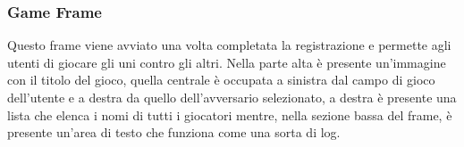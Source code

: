 \subsubsection{Game Frame}
\label{subsubsection:progettazione_game_frame}
Questo frame viene avviato una volta completata la registrazione e permette agli
utenti di giocare gli uni contro gli altri.\newline
Nella parte alta è presente un'immagine con il titolo del gioco, quella centrale
è occupata a sinistra dal campo di gioco dell'utente e a destra da quello
dell'avversario selezionato, a destra è presente una lista che elenca i nomi di
tutti i giocatori mentre, nella sezione bassa del frame, è presente un'area di
testo che funziona come una sorta di log.

\fi